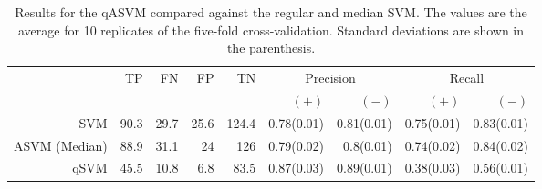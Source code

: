 \documentclass[twoside,11pt]{article}
\begin{document}
\begin{table}[htbp]\label{table:HeartDisease3}
  \centering
    \small\begin{tabular}{rrrrrrrrr}
    \hline
       & \multirow{2}{*}{TP}    & \multirow{2}{*}{FN}    & \multirow{2}{*}{FP}    & \multirow{2}{*}{TN} & \multicolumn{2}{c}{Precision} & \multicolumn{2}{c}{Recall}\\
&&&&&  $(+)$ &  $(-)$ &  $(+)$ &  $(-)$ \bigstrut\\
\hline
\hline
SVM   & 90.3  & 29.7  & 25.6  & 124.4 & 0.78(0.01) & 0.81(0.01) & 0.75(0.01) & 0.83(0.01) \bigstrut[t]\\
ASVM (Median) & 88.9  & 31.1  & 24    & 126   & 0.79(0.02) & 0.8(0.01) & 0.74(0.02) & 0.84(0.02) \\
qSVM  & 45.5  & 10.8  & 6.8   & 83.5  & 0.87(0.03) & 0.89(0.01) & 0.38(0.03) & 0.56(0.01) \bigstrut[b]\\
\hline
\hline
    \end{tabular}%
    \caption{Results for the qASVM compared against the regular and median SVM. The values are the average for 10 replicates of the five-fold cross-validation. Standard deviations are shown in the parenthesis.}
\end{table}%
\end{document}
